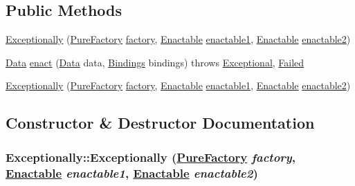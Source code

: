 \subsection*{Public Methods}
\begin{CompactItemize}
\item 
\hyperlink{classExceptionally_a0}{Exceptionally} (\hyperlink{classPureFactory}{Pure\-Factory} \hyperlink{classDataImpl_o0}{factory}, \hyperlink{interfaceEnactable}{Enactable} \hyperlink{classAbstractInfixCombinator_o0}{enactable1}, \hyperlink{interfaceEnactable}{Enactable} \hyperlink{classAbstractInfixCombinator_o1}{enactable2})
\item 
\hyperlink{interfaceData}{Data} \hyperlink{classExceptionally_a1}{enact} (\hyperlink{interfaceData}{Data} data, \hyperlink{interfaceBindings}{Bindings} bindings) throws \hyperlink{classExceptional}{Exceptional}, \hyperlink{classFailed}{Failed}
\item 
\hyperlink{classExceptionally_a2}{Exceptionally} (\hyperlink{classPureFactory}{Pure\-Factory} \hyperlink{classDataImpl_o0}{factory}, \hyperlink{interfaceEnactable}{Enactable} \hyperlink{classAbstractInfixCombinator_o0}{enactable1}, \hyperlink{interfaceEnactable}{Enactable} \hyperlink{classAbstractInfixCombinator_o1}{enactable2})
\end{CompactItemize}


\subsection{Constructor \& Destructor Documentation}
\hypertarget{classExceptionally_a0}{
\subsubsection[Exceptionally]{\setlength{\rightskip}{0pt plus 5cm}Exceptionally::Exceptionally (\hyperlink{classPureFactory}{Pure\-Factory} {\em factory}, \hyperlink{interfaceEnactable}{Enactable} {\em enactable1}, \hyperlink{interfaceEnactable}{Enactable} {\em enactable2})}}
\label{classExceptionally_a0}




